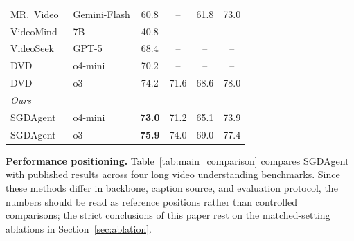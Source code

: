 \documentclass[sigconf, screen, review, anonymous]{acmart}
\begin{document}
\begin{table}[t]
\begin{tabular}{ll cccc}
    MR.~Video~\cite{mrvideo}
      & Gemini-Flash  & 60.8 & --   & 61.8 & 73.0 \\
    VideoMind~\cite{videomind}
      & 7B            & 40.8 & --   & --   & --   \\
    VideoSeek~\cite{videoseek}
      & GPT-5         & 68.4 & --   & --   & --   \\
    DVD~\cite{dvd}
      & o4-mini       & 70.2 & --   & --   & --   \\
    DVD~\cite{dvd}
      & o3            & 74.2 & 71.6 & 68.6 & 78.0 \\
    \midrule
    \multicolumn{6}{l}{\textit{Ours}} \\
    SGDAgent
      & o4-mini       & \textbf{73.0} & 71.2 & 65.1 & 73.9 \\
    SGDAgent
      & o3            & \textbf{75.9} & 74.0 & 69.0 & 77.4 \\
    \bottomrule
  \end{tabular}
\end{table}

%
%
%
%
%

\textbf{Performance positioning.}\quad
Table~\ref{tab:main_comparison} compares SGDAgent with published results
across four long video understanding benchmarks.  Since these methods
differ in backbone, caption source, and evaluation protocol, the numbers
should be read as reference positions rather than controlled comparisons;
the strict conclusions of this paper rest on the matched-setting ablations
in Section~\ref{sec:ablation}.
\end{document}
